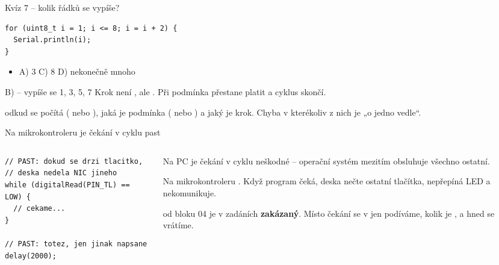 \documentclass[12pt,aspectratio=169]{beamer}
\newenvironment{odpovedi}{\footnotesize\begin{itemize}\itemsep1pt}{\end{itemize}}
\newcommand{\spravne}[1]{\alt<1>{#1}{\pozor{#1}}}
\begin{document}
\begin{frame}[fragile]{Kvíz 7 -- kolik řádků se vypíše?}
\begin{lstlisting}[style=arduino_bez_cisel]
for (uint8_t i = 1; i <= 8; i = i + 2) {
  Serial.println(i);
}
\end{lstlisting}

  \begin{odpovedi}
    \item[] A) 3 \qquad \spravne{B) 4} \qquad C) 8 \qquad D) nekonečně mnoho
  \end{odpovedi}

  \pause
  \vspace{-1mm}
  \begin{exampleblock}{B) -- vypíše se 1, 3, 5, 7}
    \footnotesize Krok není , ale . Při 
    podmínka  přestane platit a cyklus skončí.
  \end{exampleblock}
  \vspace{-1mm}
  \footnotesize
   odkud se počítá (
  nebo ), jaká je podmínka (\kod{<} nebo \kod{<=}) a jaký je krok.
  Chyba v kterékoliv z nich je „o jedno vedle``.
\end{frame}

\begin{frame}[fragile]{Na mikrokontroleru je čekání v cyklu past}
  \begin{columns}[T]
    \begin{column}{0.52\textwidth}
\begin{lstlisting}[style=arduino_bez_cisel]
// PAST: dokud se drzi tlacitko,
// deska nedela NIC jineho
while (digitalRead(PIN_TL) == LOW) {
  // cekame...
}

// PAST: totez, jen jinak napsane
delay(2000);
\end{lstlisting}
    \end{column}
    \begin{column}{0.44\textwidth}
      \footnotesize
      Na PC je čekání v cyklu neškodné -- operační systém mezitím obsluhuje
      všechno ostatní.

      \vspace{2mm}
      Na mikrokontroleru . Když program
      čeká, deska nečte ostatní tlačítka, nepřepíná LED a nekomunikuje.

      \vspace{2mm}
      \scriptsize
       od bloku 04 je  v zadáních
      \textbf{zakázaný}. Místo čekání se v  jen podíváme, kolik je
      , a hned se vrátíme.
    \end{column}
  \end{columns}
\end{frame}
\end{document}
